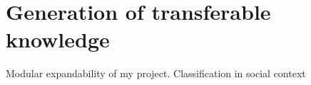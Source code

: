 \chapter{Generation of transferable knowledge}\label{ch:knowledge}

Modular expandability of my project.
Classification in social context
